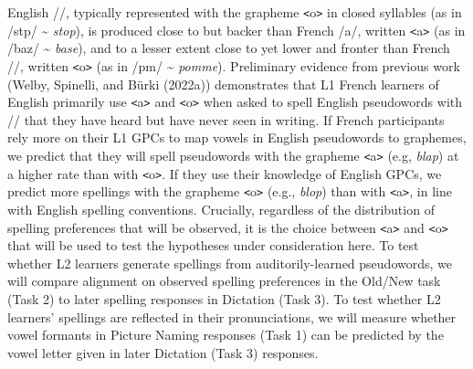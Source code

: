 \documentclass[
  english,
  man,floatsintext]{apa7}
\begin{document}
English /\textscripta/, typically represented with the grapheme \texttt{\textless{}}o\texttt{\textgreater{}} in closed syllables (as in /st\textscripta p/ \textasciitilde{} \emph{stop}), is produced close to but backer than French /a/, written \texttt{\textless{}}a\texttt{\textgreater{}} (as in /baz/ \textasciitilde{} \emph{base}), and to a lesser extent close to yet lower and fronter than French /\textopeno/, written \texttt{\textless{}}o\texttt{\textgreater{}} (as in /p\textopeno m/ \textasciitilde{} \emph{pomme}). Preliminary evidence from previous work (Welby, Spinelli, and Bürki (2022a)) demonstrates that L1 French learners of English primarily use \texttt{\textless{}}a\texttt{\textgreater{}} and \texttt{\textless{}}o\texttt{\textgreater{}} when asked to spell English pseudowords with /\textscripta/ that they have heard but have never seen in writing. If French participants rely more on their L1 GPCs to map vowels in English pseudowords to graphemes, we predict that they will spell pseudowords with the grapheme \texttt{\textless{}}a\texttt{\textgreater{}} (e.g, \emph{blap}) at a higher rate than with \texttt{\textless{}}o\texttt{\textgreater{}}. If they use their knowledge of English GPCs, we predict more spellings with the grapheme \texttt{\textless{}}o\texttt{\textgreater{}} (e.g., \emph{blop}) than with \texttt{\textless{}}a\texttt{\textgreater{}}, in line with English spelling conventions. Crucially, regardless of the distribution of spelling preferences that will be observed, it is the choice between \texttt{\textless{}}a\texttt{\textgreater{}} and \texttt{\textless{}}o\texttt{\textgreater{}} that will be used to test the hypotheses under consideration here. To test whether L2 learners generate spellings from auditorily-learned pseudowords, we will compare alignment on observed spelling preferences in the Old/New task (Task 2) to later spelling responses in Dictation (Task 3). To test whether L2 learners' spellings are reflected in their pronunciations, we will measure whether vowel formants in Picture Naming responses (Task 1) can be predicted by the vowel letter given in later Dictation (Task 3) responses.
\end{document}
